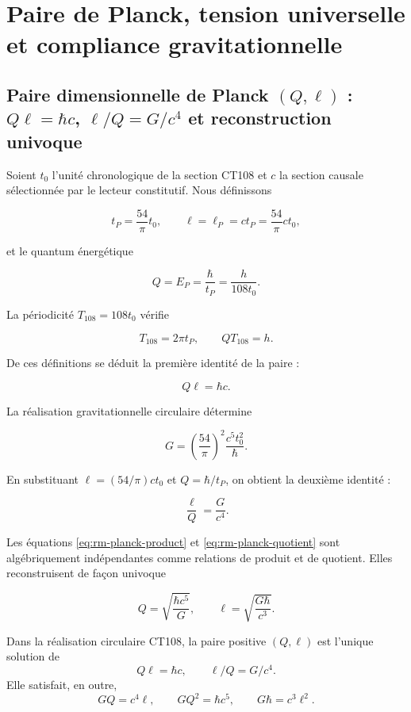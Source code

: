 \chapter{Paire de Planck, tension universelle et compliance gravitationnelle}
\label{chap:pareja-planck-respuesta}

\section{Paire dimensionnelle de Planck \((Q,\ell)\) : \(Q\ell=\hbar c\), \(\ell/Q=G/c^4\) et reconstruction univoque}

Soient \(t_0\) l'unité chronologique de la section CT108 et \(c\) la
section causale sélectionnée par le lecteur constitutif. Nous définissons

\[
t_P=\frac{54}{\pi}t_0,
\qquad
\ell=\ell_P=ct_P=\frac{54}{\pi}ct_0,
\]

et le quantum énergétique

\[
Q=E_P=\frac{\hbar}{t_P}=\frac{h}{108t_0}.
\]

La périodicité \(T_{108}=108t_0\) vérifie

\[
T_{108}=2\pi t_P,
\qquad
QT_{108}=h.
\]

De ces définitions se déduit la première identité de la paire :

\begin{equation}
\boxed{Q\ell=\hbar c.}
\label{eq:rm-planck-product}
\end{equation}

La réalisation gravitationnelle circulaire détermine

\[
G=\left(\frac{54}{\pi}\right)^2\frac{c^5t_0^2}{\hbar}.
\]

En substituant \(\ell=(54/\pi)ct_0\) et \(Q=\hbar/t_P\), on obtient la
deuxième identité :

\begin{equation}
\boxed{\frac{\ell}{Q}=\frac{G}{c^4}.}
\label{eq:rm-planck-quotient}
\end{equation}

Les équations \eqref{eq:rm-planck-product} et
\eqref{eq:rm-planck-quotient} sont algébriquement indépendantes comme
relations de produit et de quotient. Elles reconstruisent de façon univoque

\[
Q=\sqrt{\frac{\hbar c^5}{G}},
\qquad
\ell=\sqrt{\frac{G\hbar}{c^3}}.
\]

\begin{theorem}
\label{thm:rm-planck-pair}
Dans la réalisation circulaire CT108, la paire positive \((Q,\ell)\) est
l'unique solution de
\[
Q\ell=\hbar c,
\qquad
\ell/Q=G/c^4.
\]
Elle satisfait, en outre,
\[
GQ=c^4\ell,
\qquad
GQ^2=\hbar c^5,
\qquad
G\hbar=c^3\ell^2.
\]
\end{theorem}

